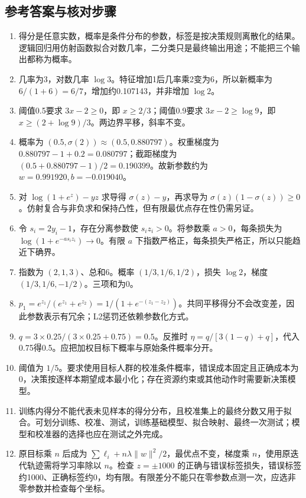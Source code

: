 \documentclass[UTF8,fontset=none,zihao=-4,a4paper]{ctexart}
\numberwithin{equation}{section}
\numberwithin{figure}{section}
\begin{document}
\subsection{参考答案与核对步骤}
\begin{enumerate}[label=13.\arabic*.,before={\interlinepenalty=10000}]
\item 得分是任意实数，概率是条件分布的参数，标签是按决策规则离散化的结果。逻辑回归用仿射函数拟合对数几率，二分类只是最终输出用途；不能把三个输出都称为概率。
\item 几率为3，对数几率 $\log3$。特征增加1后几率乘2变为6，所以新概率为 $6/(1+6)=6/7$，增加约0.107143，并非增加 $\log2$。
\item 阈值0.5要求 $3x-2\ge0$，即 $x\ge2/3$；阈值0.9要求 $3x-2\ge\log9$，即 $x\ge(2+\log9)/3$。两边界平移，斜率不变。
\item 概率为 $(0.5,\sigma(2))\approx(0.5,0.880797)$。权重梯度为 $0.880797-1+0.2=0.080797$；截距梯度为 $(0.5+0.880797-1)/2=0.190399$。故新参数约为 $w=0.991920,b=-0.019040$。
\item 对 $\log(1+e^z)-yz$ 求导得 $\sigma(z)-y$，再求导为 $\sigma(z)(1-\sigma(z))\ge0$。仿射复合与非负求和保持凸性，但有限最优点存在性仍需另证。
\item 令 $s_i=2y_i-1$，存在分离参数使 $s_iz_i>0$。将参数乘 $a>0$，每条损失为 $\log(1+e^{-as_iz_i})\to0$。有限 $a$ 下指数严格正，每条损失严格正，所以只能趋近下确界。
\item 指数为 $(2,1,3)$、总和6。概率 $(1/3,1/6,1/2)$，损失 $\log2$，梯度 $(1/3,1/6,-1/2)$。三项和为0。
\item $p_1=e^{z_1}/(e^{z_1}+e^{z_2})=1/(1+e^{-(z_1-z_2)})$。共同平移得分不会改变差，因此参数表示有冗余；L2惩罚还依赖参数化方式。
\item $q=3\times0.25/(3\times0.25+0.75)=0.5$。反推时 $\eta=q/[3(1-q)+q]$，代入0.75得0.5。应把加权目标下概率与原始条件概率分开。
\item 阈值为 $1/5$。要求使用目标人群的校准条件概率，错误成本固定且正确成本为0，决策按逐样本期望成本最小化；存在资源约束或其他动作时需要新决策模型。
\item 训练内得分不能代表未见样本的得分分布，且校准集上的最终分数又用于拟合。可划分训练、校准、测试，训练基础模型、拟合映射、最终一次测试；模型和校准器的选择也应在测试之外完成。
\item 原目标乘 $n$ 后成为 $\sum\ell_i+n\lambda\|w\|^2/2$，最优点不变，梯度乘 $n$，使用原迭代轨迹需将学习率除以 $n$。检查 $z=\pm1000$ 的正确与错误标签损失，错误标签约1000、正确标签约0，均有限。有限差分不能只在零参数点测一次，应选非零参数并检查每个坐标。
\end{enumerate}
\end{document}
